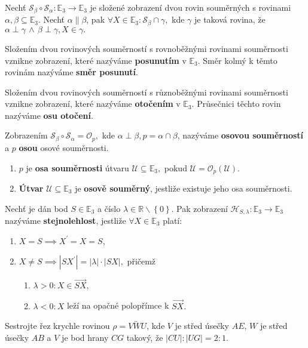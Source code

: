 \begin{veta}
    Nechť $\mathscr S_\beta \circ \mathscr S_\alpha: \mathbb E_3 \to \mathbb E_3$ je
    složené zobrazení dvou rovin souměrných s rovinami $\alpha, \beta\subseteq \mathbb
    E_3$. Nechť $\alpha \parallel \beta$, pak $\forall X\in \mathbb E_3: \mathscr
    S_\beta \cap \gamma,$ kde $\gamma$ je taková rovina, že $\alpha \perp \gamma \, \land\,
    \beta \perp \gamma, X \in \gamma.$
\end{veta}

\begin{definition}
    Složením dvou rovinových souměrností s rovnoběžnými rovinami souměrnosti vznikne
    zobrazení, které nazýváme \textbf{posunutím} v $\mathbb E_3.$ Směr kolmý k těmto
    rovinám nazýváme \textbf{směr posunutí}.
\end{definition}

\begin{definition}
    Složením dvou rovinových souměrností s různoběžnými rovinami souměrnosti vznikne
    zobrazení, které nazýváme \textbf{otočením} v $\mathbb E_3.$ Průsečnici těchto
    rovin nazýváme \textbf{osu otočení}.
\end{definition}

\begin{definition}
    Zobrazením $\mathscr S_\beta \circ \mathscr S_\alpha = \mathscr O_p,$ kde
    $\alpha \perp \beta, p=\alpha \cap \beta$, nazýváme \textbf{osovou souměrností}
    a $p$ \textbf{osou} osové souměrnosti.
\end{definition}

\begin{definition}
\begin{enumerate}[$i.$]
\item $p$ je \textbf{osa souměrnosti} útvaru $\mathscr U\subseteq \mathbb E_3,$
pokud $\mathscr U = \mathscr O_p(\mathscr U).$
\item \textbf{Útvar} $\mathscr U \subseteq \mathbb E_3$ je \textbf{osově souměrný},
jestliže existuje jeho osa souměrnosti.
\end{enumerate}
\end{definition}

\begin{definition}
    Nechť je dán bod $S\in \mathbb E_3$ a číslo $\lambda \in \mathbb R \smallsetminus \left \{ 0
    \right \}. $ Pak zobrazení $\mathscr H_{S,\lambda}: \mathbb E_3 \to \mathbb E_3$
   nazýváme \textbf{stejnolehlost}, jestliže $\forall X \in \mathbb E_3$ platí:
   \begin{enumerate}[$i.$]
   \item $X=S\implies X^\prime =X=S$,
  	\item $X\ne S\implies |SX^\prime| = |\lambda|\cdot |SX|,$ přičemž
   \begin{enumerate}[$a.$]
   \item $\lambda > 0: X\in \overrightarrow{SX},$
  	\item $\lambda < 0: X$ leží na opačné polopřímce k $\overrightarrow{SX}.$
   \end{enumerate}
   \end{enumerate}
\end{definition}

\begin{priklad}
Sestrojte řez krychle rovinou $\rho=\overleftrightarrow{VWU}$, kde $V$ je střed
úsečky $AE$, $W$ je střed úsečky $AB$ a $V$ je bod hrany $CG$ takový, že $|CU|:|UG|=2:1$.
\end{priklad}
